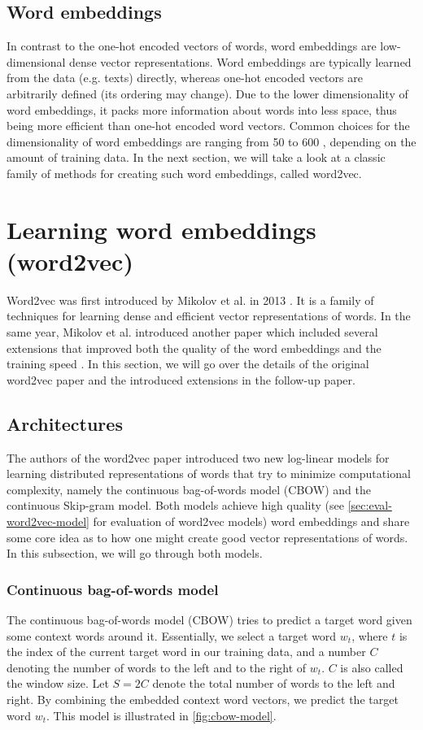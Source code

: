 \subsection{Word embeddings}
In contrast to the one-hot encoded vectors of words, word embeddings are low-dimensional dense vector representations. Word embeddings are typically learned from the data (e.g. texts) directly, whereas one-hot encoded vectors are arbitrarily defined (its ordering may change). Due to the lower dimensionality of word embeddings, it packs more information about words into less space, thus being more efficient than one-hot encoded word vectors. Common choices for the dimensionality of word embeddings are ranging from 50 to 600 \cite{mikolov2013a}, depending on the amount of training data. In the next section, we will take a look at a classic family of methods for creating such word embeddings, called word2vec.

\section{Learning word embeddings (word2vec)}
Word2vec was first introduced by Mikolov et al. in 2013 \cite{mikolov2013a}. It is a family of techniques for learning dense and efficient vector representations of words. In the same year, Mikolov et al. introduced another paper which included several extensions that improved both the quality of the word embeddings and the training speed \cite{mikolov2013b}. In this section, we will go over the details of the original word2vec paper and the introduced extensions in the follow-up paper.

\subsection{Architectures}
The authors of the word2vec paper introduced two new log-linear models for learning distributed representations of words that try to minimize computational complexity, namely the continuous bag-of-words model (CBOW) and the continuous Skip-gram model. Both models achieve high quality (see \cref{sec:eval-word2vec-model} for evaluation of word2vec models) word embeddings \cite{mikolov2013a} and share some core idea as to how one might create good vector representations of words. In this subsection, we will go through both models.

\subsubsection{Continuous bag-of-words model}
The continuous bag-of-words model (CBOW) tries to predict a target word given some context words around it. Essentially, we select a target word $w_t$, where $t$ is the index of the current target word in our training data, and a number $C$ denoting the number of words to the left and to the right of $w_t$. $C$ is also called the window size. Let $S=2C$ denote the total number of words to the left and right. By combining the embedded context word vectors, we predict the target word $w_t$. This model is illustrated in \cref{fig:cbow-model}.

